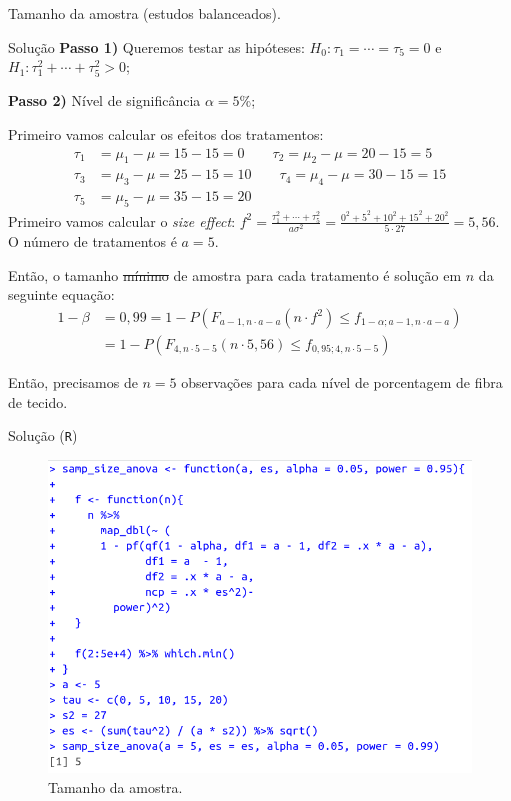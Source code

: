 \documentclass[8pt]{beamer}
\begin{document}
\begin{frame}{Tamanho da amostra (estudos balanceados).}

\begin{block}{Solução}
	\textbf{Passo 1)} Queremos testar as hipóteses: $H_0: \tau_1 = \cdots = \tau_5 = 0$ e $H_1: \tau_1^2 + \cdots + \tau_5^2 > 0$;

	\textbf{Passo 2)} Nível de significância $\alpha=5\%$;
	
	Primeiro vamos calcular os efeitos dos tratamentos:
	\begin{align*}
	\tau_1 &= \mu_1 - \mu = 15 -15=0\qquad \tau_2 = \mu_2 - \mu = 20 -15=5\\
	\tau_3 &= \mu_3 - \mu = 25 -15=10\qquad \tau_4 = \mu_4 - \mu = 30 -15=15\\
	\tau_5 &= \mu_5 - \mu = 35 -15=20
	\end{align*}
	Primeiro vamos calcular o \textit{size effect}: $f^2 = \frac{\tau_1^2 + \cdots + \tau_5^2}{a\sigma^2} = \frac{0^2 + 5^2 + 10^2 + 15^2 + 20^2}{5 \cdot 27} = 5,56$.	O número de tratamentos é $a=5$.
	
	Então, o tamanho \sout{mínimo} de amostra para cada tratamento é solução em $n$ da seguinte equação:
	\begin{align*}
	1-\beta &= 0,99 = 1 - P \left( F_{a-1, n \cdot a - a}\left(n \cdot f^2\right) \leq f_{1-\alpha; a-1, n\cdot a - a} \right)\\
	&= 1 - P \left( F_{4, n \cdot 5 - 5}\left(n\cdot 5,56\right) \leq f_{0,95; 4, n\cdot 5 - 5} \right)
	\end{align*}
	
	Então, precisamos de $n=5$ observações para cada nível de porcentagem de fibra de tecido.
\end{block}

\end{frame}

\begin{frame}
\begin{block}{Solução (\texttt{R})}
	\begin{figure}[htbp]
		\centering
		\includegraphics[width=0.9\linewidth]{figure/samp_size_anova.png}
		\caption{Tamanho da amostra.}
	\end{figure}
\end{block}
\end{frame}
\end{document}
